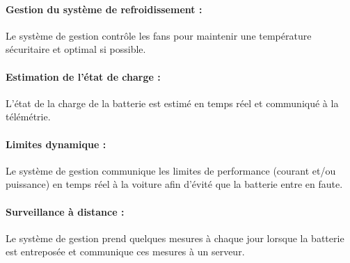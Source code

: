 			\paragraph{Gestion du système de refroidissement :} 
			Le système de gestion contrôle les fans pour maintenir une température sécuritaire et optimal si possible.
			
			\paragraph{Estimation de l'état de charge :}
			L'état de la charge de la batterie est estimé en temps réel et communiqué à la télémétrie.
			
			\paragraph{Limites dynamique :}
			Le système de gestion communique les limites de performance (courant et/ou puissance) en temps réel à la voiture afin d’évité que la batterie entre en faute.
			
			\paragraph{Surveillance à distance :}
			Le système de gestion prend quelques mesures à chaque jour lorsque la batterie est entreposée et communique ces mesures à un serveur.		
		
